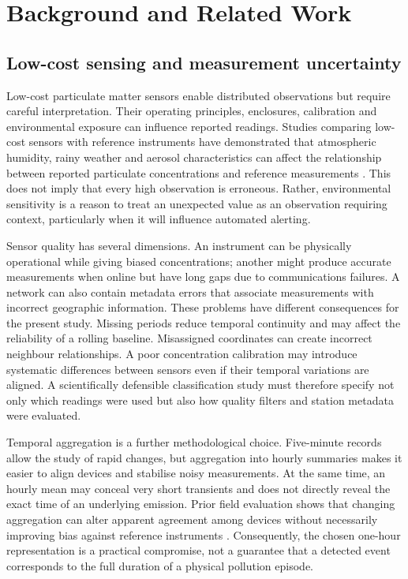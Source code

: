 \documentclass[12pt,a4paper,oneside]{report}
\begin{document}
\chapter{Background and Related Work}
\section{Low-cost sensing and measurement uncertainty}
Low-cost particulate matter sensors enable distributed observations but require careful interpretation. Their operating principles, enclosures, calibration and environmental exposure can influence reported readings. Studies comparing low-cost sensors with reference instruments have demonstrated that atmospheric humidity, rainy weather and aerosol characteristics can affect the relationship between reported particulate concentrations and reference measurements \citep{huang2022}. This does not imply that every high observation is erroneous. Rather, environmental sensitivity is a reason to treat an unexpected value as an observation requiring context, particularly when it will influence automated alerting.

Sensor quality has several dimensions. An instrument can be physically operational while giving biased concentrations; another might produce accurate measurements when online but have long gaps due to communications failures. A network can also contain metadata errors that associate measurements with incorrect geographic information. These problems have different consequences for the present study. Missing periods reduce temporal continuity and may affect the reliability of a rolling baseline. Misassigned coordinates can create incorrect neighbour relationships. A poor concentration calibration may introduce systematic differences between sensors even if their temporal variations are aligned. A scientifically defensible classification study must therefore specify not only which readings were used but also how quality filters and station metadata were evaluated.

Temporal aggregation is a further methodological choice. Five-minute records allow the study of rapid changes, but aggregation into hourly summaries makes it easier to align devices and stabilise noisy measurements. At the same time, an hourly mean may conceal very short transients and does not directly reveal the exact time of an underlying emission. Prior field evaluation shows that changing aggregation can alter apparent agreement among devices without necessarily improving bias against reference instruments \citep{huang2022}. Consequently, the chosen one-hour representation is a practical compromise, not a guarantee that a detected event corresponds to the full duration of a physical pollution episode.
\end{document}

